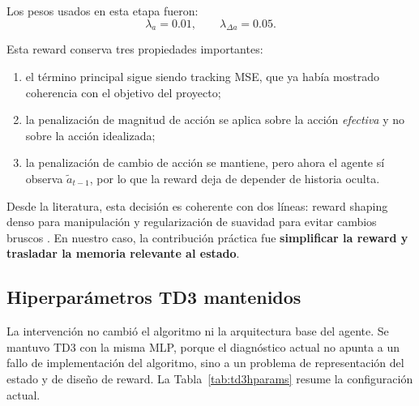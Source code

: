 \documentclass[11pt,a4paper]{article}
\begin{document}
Los pesos usados en esta etapa fueron:
\begin{equation}
\lambda_a = 0.01,
\qquad
\lambda_{\Delta a} = 0.05.
\label{eq:reward_weights}
\end{equation}

Esta reward conserva tres propiedades importantes:
\begin{enumerate}[leftmargin=1.2cm]
    \item el t\'ermino principal sigue siendo tracking MSE, que ya hab\'ia mostrado coherencia con el objetivo del proyecto;
    \item la penalizaci\'on de magnitud de acci\'on se aplica sobre la acci\'on \emph{efectiva} y no sobre la acci\'on idealizada;
    \item la penalizaci\'on de cambio de acci\'on se mantiene, pero ahora el agente s\'i observa \(\tilde{a}_{t-1}\), por lo que la reward deja de depender de historia oculta.
\end{enumerate}

Desde la literatura, esta decisi\'on es coherente con dos l\'ineas: reward shaping denso para manipulaci\'on y regularizaci\'on de suavidad para evitar cambios bruscos \citep{deng2025reward,lee2024smoothness}. En nuestro caso, la contribuci\'on pr\'actica fue \textbf{simplificar la reward y trasladar la memoria relevante al estado}.

\subsection{Hiperpar\'ametros TD3 mantenidos}

La intervenci\'on no cambi\'o el algoritmo ni la arquitectura base del agente. Se mantuvo TD3 con la misma MLP, porque el diagn\'ostico actual no apunta a un fallo de implementaci\'on del algoritmo, sino a un problema de representaci\'on del estado y de dise\~no de reward. La Tabla~\ref{tab:td3hparams} resume la configuraci\'on actual.
\end{document}
